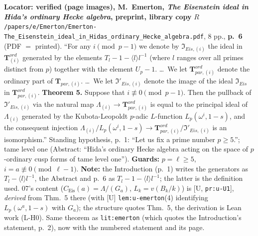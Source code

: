 \begin{hypothesis}\label{lit:hz-emerton-eis}
  \leanok
  \textbf{Locator: verified (page images), M.~Emerton, \emph{The Eisenstein ideal in Hida's ordinary Hecke algebra}, preprint, library copy} $R$\texttt{/papers/e/Emerton/Emerton-The\_Eisenstein\_ideal\_in\_Hidas\_ordinary\_Hecke\_algebra.pdf}, 8 pp.,
  \textbf{p.~6} (PDF $=$ printed). ``For any $i\pmod{p-1}$ we denote by $\mathfrak I_{Eis,(i)}$ the ideal in $\mathbf T^{ord}_{(i)}$ generated by the
  elements $T_l-1-\langle l\rangle l^{-1}$ (where $l$ ranges over all primes distinct from $p$) together with the element $U_p-1$. \dots\ We let
  $\mathbf T^{ord}_{par,(i)}$ denote the ordinary part of $\mathbf T_{par,(i)}$. \dots\ We let $\mathfrak I'_{Eis,(i)}$ denote the image of the ideal
  $\mathfrak I_{Eis}$ in $\mathbf T^{ord}_{par,(i)}$. \textbf{Theorem 5.} Suppose that $i\not\equiv0\pmod{p-1}$. Then the pullback of $\mathfrak I'_{Eis,(i)}$
  via the natural map $\Lambda_{(i)}\to\mathbf T^{ord}_{par,(i)}$ is equal to the principal ideal of $\Lambda_{(i)}$ generated by the Kubota-Leopoldt
  $p$-adic $L$-function $L_p(\omega^i,1-s)$, and the consequent injection $\Lambda_{(i)}/L_p(\omega^i,1-s)\to\mathbf T^{ord}_{par,(i)}/\mathfrak I'_{Eis,(i)}$ is
  an isomorphism.'' Standing hypothesis, p.~1: ``Let us fix a prime number $p\ge5$.''; tame level one (Abstract: ``Hida's ordinary Hecke algebra
  acting on the space of $p$-ordinary cusp forms of tame level one'').
  \textbf{Guards:} $p=\ell\ge5$, $i=a\not\equiv0\pmod{\ell-1}$. \textbf{Note:} the Introduction (p.~1) writes the generators as
  $T_l-\langle l\rangle l^{-1}$, the Abstract and p.~6 as $T_l-1-\langle l\rangle l^{-1}$; the latter is the definition used. 07's content
  ($C_{\mathrm{Eis}}(a)=\Lambda/(G_a)$, $L_k=v(B_k/k)$) is [U, \texttt{pr:u-U1}], \emph{derived} from Thm.~5 there (with [U]
  \texttt{lem:u-emerton}(4) identifying $L_p(\omega^a,1-s)$ with $G_a$); the structure quotes Thm.~5, the derivation is Lean work (L-H0).
  Same theorem as \texttt{lit:emerton} (which quotes the Introduction's statement, p.~2), now with the numbered statement and its page.
\end{hypothesis}

